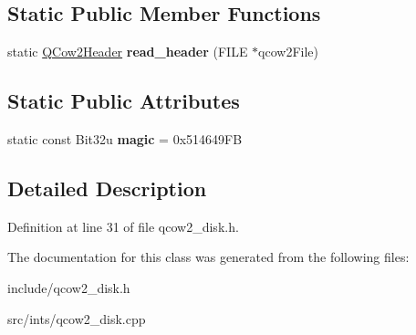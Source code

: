 \subsection*{Static Public Member Functions}
\begin{DoxyCompactItemize}
\item 
\hypertarget{classQCow2Image_aee76130ce0d74f53d39ec09450ee7efd}{static \hyperlink{structQCow2Image_1_1QCow2Header}{Q\-Cow2\-Header} {\bfseries read\-\_\-header} (F\-I\-L\-E $\ast$qcow2\-File)}\label{classQCow2Image_aee76130ce0d74f53d39ec09450ee7efd}

\end{DoxyCompactItemize}
\subsection*{Static Public Attributes}
\begin{DoxyCompactItemize}
\item 
\hypertarget{classQCow2Image_ab13614f8e9a644877a2424665cfea9de}{static const Bit32u {\bfseries magic} = 0x514649\-F\-B}\label{classQCow2Image_ab13614f8e9a644877a2424665cfea9de}

\end{DoxyCompactItemize}


\subsection{Detailed Description}


Definition at line 31 of file qcow2\-\_\-disk.\-h.



The documentation for this class was generated from the following files\-:\begin{DoxyCompactItemize}
\item 
include/qcow2\-\_\-disk.\-h\item 
src/ints/qcow2\-\_\-disk.\-cpp\end{DoxyCompactItemize}
